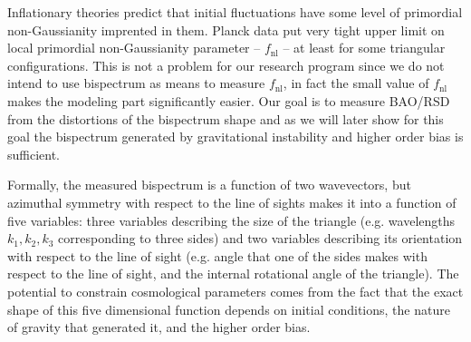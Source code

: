 Inflationary theories predict that initial fluctuations have some level of primordial non-Gaussianity imprented in them.
Planck data put very tight upper limit on local primordial non-Gaussianity parameter -- $f_\mathrm{nl}$ -- at least for some triangular configurations.
This is not a problem for our research program since we do not intend to use bispectrum as means to measure $f_\mathrm{nl}$, in fact the small value
of $f_\mathrm{nl}$ makes the modeling part significantly easier. Our goal is to measure BAO/RSD from the distortions of the bispectrum shape
and as we will later show for this goal the bispectrum generated by gravitational instability and higher order bias is sufficient.

Formally, the measured bispectrum is a function of two wavevectors, but azimuthal symmetry with respect to the line of sights makes it into a function
of five variables: three variables describing the size of the triangle (e.g. wavelengths $k_1, k_2, k_3$ corresponding to three sides) and two variables
describing its orientation with respect to the line of sight (e.g. angle that one of the sides makes with respect to the line of sight, and
the internal rotational angle of the triangle). The potential to constrain cosmological parameters comes from the fact that the exact shape of this 
five dimensional function depends on initial conditions, the nature of gravity that generated it, and the higher order bias.

